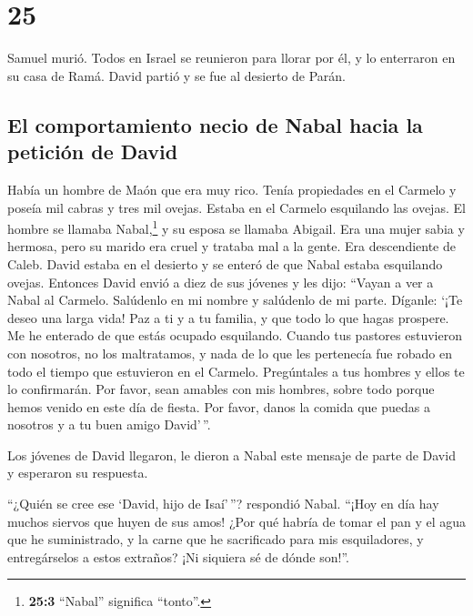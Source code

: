 \hypertarget{section-24}{%
\section{25}\label{section-24}}

 Samuel murió. Todos en Israel se reunieron para llorar
por él, y lo enterraron en su casa de Ramá. David partió y se fue al
desierto de Parán.

\hypertarget{el-comportamiento-necio-de-nabal-hacia-la-peticiuxf3n-de-david}{%
\subsection{El comportamiento necio de Nabal hacia la petición de
David}\label{el-comportamiento-necio-de-nabal-hacia-la-peticiuxf3n-de-david}}

 Había un hombre de Maón que era muy rico. Tenía
propiedades en el Carmelo y poseía mil cabras y tres mil ovejas. Estaba
en el Carmelo esquilando las ovejas.  El hombre se llamaba
Nabal,\footnote{\textbf{25:3} ``Nabal'' significa ``tonto''.} y su
esposa se llamaba Abigail. Era una mujer sabia y hermosa, pero su marido
era cruel y trataba mal a la gente. Era descendiente de Caleb.
 David estaba en el desierto y se enteró de que Nabal
estaba esquilando ovejas.  Entonces David envió a diez de
sus jóvenes y les dijo: ``Vayan a ver a Nabal al Carmelo. Salúdenlo en
mi nombre y salúdenlo de mi parte.  Díganle: `¡Te deseo
una larga vida! Paz a ti y a tu familia, y que todo lo que hagas
prospere.  Me he enterado de que estás ocupado esquilando.
Cuando tus pastores estuvieron con nosotros, no los maltratamos, y nada
de lo que les pertenecía fue robado en todo el tiempo que estuvieron en
el Carmelo.  Pregúntales a tus hombres y ellos te lo
confirmarán. Por favor, sean amables con mis hombres, sobre todo porque
hemos venido en este día de fiesta. Por favor, danos la comida que
puedas a nosotros y a tu buen amigo David'\,''.

 Los jóvenes de David llegaron, le dieron a Nabal este
mensaje de parte de David y esperaron su respuesta.

 ``¿Quién se cree ese `David, hijo de Isaí'\,''?
respondió Nabal. ``¡Hoy en día hay muchos siervos que huyen de sus amos!
 ¿Por qué habría de tomar el pan y el agua que he
suministrado, y la carne que he sacrificado para mis esquiladores, y
entregárselos a estos extraños? ¡Ni siquiera sé de dónde son!''.

